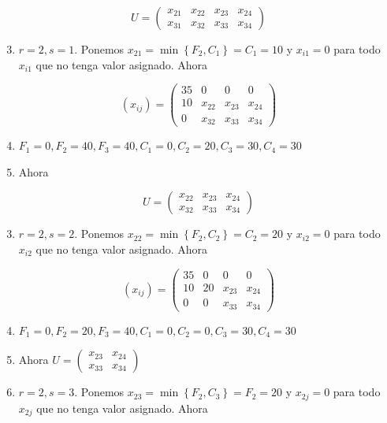 \documentclass[10pt]{article}
\begin{document}
$$
U=\left(\begin{array}{llll}
x_{21} & x_{22} & x_{23} & x_{24} \\
x_{31} & x_{32} & x_{33} & x_{34}
\end{array}\right)
$$

\begin{enumerate}
  \setcounter{enumi}{2}
  \item $r=2, s=1$. Ponemos $x_{21}=\min \left\{F_{2}, C_{1}\right\}=C_{1}=10$ y $x_{i 1}=0$ para todo $x_{i 1}$ que no tenga valor asignado. Ahora
\end{enumerate}

$$
\left(x_{i j}\right)=\left(\begin{array}{cccc}
35 & 0 & 0 & 0 \\
10 & x_{22} & x_{23} & x_{24} \\
0 & x_{32} & x_{33} & x_{34}
\end{array}\right)
$$

\begin{enumerate}
  \setcounter{enumi}{3}
  \item $F_{1}=0, F_{2}=40, F_{3}=40, C_{1}=0, C_{2}=20, C_{3}=30, C_{4}=30$
  \item Ahora
\end{enumerate}

$$
U=\left(\begin{array}{lll}
x_{22} & x_{23} & x_{24} \\
x_{32} & x_{33} & x_{34}
\end{array}\right)
$$

\begin{enumerate}
  \setcounter{enumi}{2}
  \item $r=2, s=2$. Ponemos $x_{22}=\min \left\{F_{2}, C_{2}\right\}=C_{2}=20$ y $x_{i 2}=0$ para todo $x_{i 2}$ que no tenga valor asignado. Ahora
\end{enumerate}

$$
\left(x_{i j}\right)=\left(\begin{array}{cccc}
35 & 0 & 0 & 0 \\
10 & 20 & x_{23} & x_{24} \\
0 & 0 & x_{33} & x_{34}
\end{array}\right)
$$

\begin{enumerate}
  \setcounter{enumi}{3}
  \item $F_{1}=0, F_{2}=20, F_{3}=40, C_{1}=0, C_{2}=0, C_{3}=30, C_{4}=30$
  \item Ahora $U=\left(\begin{array}{ll}x_{23} & x_{24} \\ x_{33} & x_{34}\end{array}\right)$
  \item $r=2, s=3$. Ponemos $x_{23}=\min \left\{F_{2}, C_{3}\right\}=F_{2}=20$ y $x_{2 j}=0$ para todo $x_{2 j}$ que no tenga valor asignado. Ahora
\end{enumerate}
\end{document}
